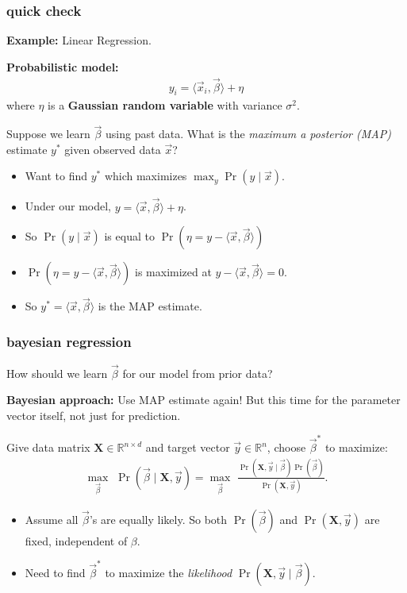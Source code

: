 \documentclass[handout,compress]{beamer}
\newcommand{\bv}[1]{\mathbf{#1}}
\newcommand{\R}{\mathbb{R}}
\begin{document}
\begin{frame}
	\frametitle{quick check}
	\textbf{Example:} Linear Regression. 

	\textbf{Probabilistic model:}
	\begin{align*}
	y_i = \langle \vec{x}_i, \vec{\beta} \rangle+ \eta
	\end{align*}	
	where $\eta$ is a \textbf{Gaussian random variable} with variance $\sigma^2$.
	
	
	\begin{center}
		Suppose we learn $\vec{\beta}$ using past data. What is the \emph{maximum a posterior (MAP)} estimate $y^*$ given observed data $\vec{x}$?
	\end{center}

\begin{itemize}
	\item Want to find $y^*$ which maximizes $\max_{y} \Pr(y \mid \vec{x})$. 
	\item Under our model, $y = \langle \vec{x}, \vec{\beta} \rangle+ \eta$.
	\item So $\Pr(y \mid \vec{x})$ is equal to $\Pr(\eta = y - \langle \vec{x}, \vec{\beta} \rangle)$
	\item $\Pr(\eta = y - \langle \vec{x}, \vec{\beta} \rangle)$ is maximized at $y - \langle \vec{x}, \vec{\beta} \rangle = 0$.
	\item So $y^* = \langle \vec{x}, \vec{\beta} \rangle$ is the MAP estimate.
\end{itemize}
\end{frame}

\begin{frame}
	\frametitle{bayesian regression}
	\begin{center}
		\alert{How should we learn $\vec{\beta}$ for our model from prior data?}
	\end{center}
		\textbf{Bayesian approach:} Use MAP estimate again! But this time for the parameter vector itself, not just for prediction.
		
		 Give data matrix $\bv{X}\in \R^{n\times d}$ and target vector $\vec{y} \in \R^n$, choose $\vec{\beta}^*$ to  maximize:
		\begin{align*}
		\max_{\vec{\beta}}\,\,\Pr(\vec{\beta} \mid \bv{X},\vec{y} )  = \max_{\vec{\beta}}\,\,\frac{\Pr(\bv{X},\vec{y} \mid  \vec{\beta} ) \Pr(\vec{\beta} )  }{\Pr(\bv{X},\vec{y} )}.
		\end{align*}
		
		\begin{itemize}
		\item Assume all $\vec{\beta}$'s are equally likely. So both $\Pr(\vec{\beta} )$ and $\Pr(\bv{X},\vec{y} )$ are fixed, independent of $\beta$.
		
		\item Need to find $\vec{\beta}^*$ to  maximize the \emph{likelihood} $\Pr(\bv{X},\vec{y}  \mid  \vec{\beta} ).$
		\end{itemize}
\end{frame}
\end{document}
